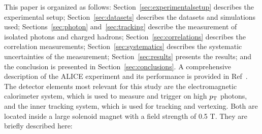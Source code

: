 \documentclass[ALICE,manyauthors]{cernphprep}
\newcommand{\pt}           {\ensuremath{p_{\rm T}}\xspace}
\providecommand{\DIFaddtex}[1]{{\protect\color{blue}\uwave{#1}}} %
\providecommand{\DIFaddbegin}{} %
\providecommand{\DIFaddend}{} %
\providecommand{\DIFadd}[1]{\texorpdfstring{\DIFaddtex{#1}}{#1}} %
\newcommand{\DIFaddincludegraphics}[2][]{{\color{blue}\fbox{\DIFOincludegraphics[#1]{#2}}}} %
\DeclareRobustCommand{\DIFaddbegin}{\DIFOaddbegin \let\includegraphics\DIFaddincludegraphics} %
\DeclareRobustCommand{\DIFaddend}{\DIFOaddend \let\includegraphics\DIFOincludegraphics} %
\begin{document}
\DIFaddbegin 

\DIFaddend %

This paper is organized as follows: Section~\ref{sec:experimentalsetup} describes the experimental setup; Section~\ref{sec:datasets} describes the datasets and simulations used; Sections~\ref{sec:photon} and~\ref{sec:tracking} describe the measurement of isolated photons and charged hadrons; Section~\ref{sec:correlations} describes the correlation measurements; Section~\ref{sec:systematics} describes the systematic uncertainties of the measurement; Section~\ref{sec:results} presents the results; and the conclusion is presented in Section~\ref{sec:conclusions}.
\label{sec:experimentalsetup}
A comprehensive description of the ALICE experiment and its performance is provided in Ref\DIFaddbegin \DIFadd{.}\DIFaddend ~\cite{Allen:2010stl,Abelev:2014ffa}. The detector elements most relevant for this study are the electromagnetic calorimeter system, which is used to measure and trigger on high $\pt$ photons, and the inner tracking system, which is used for tracking and vertexing. Both are located inside a large solenoid magnet with a field strength of 0.5 T. They are briefly described here:
\end{document}
